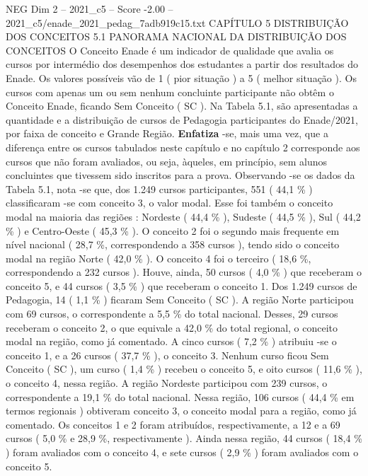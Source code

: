 \begin{textsample}{NEG Dim 2 – 2021\_c5 – Score -2.00 – 2021\_c5/enade\_2021\_pedag\_7adb919c15.txt}  \label{ex:f2_neg_143}
CAPÍTULO 5 DISTRIBUIÇÃO DOS CONCEITOS 5.1 PANORAMA NACIONAL DA DISTRIBUIÇÃO DOS CONCEITOS O Conceito Enade é um indicador de qualidade que avalia os cursos por intermédio dos desempenhos dos estudantes a partir dos resultados do Enade.
Os valores possíveis vão de 1 ( pior situação ) a 5 ( melhor situação ).
Os cursos com apenas um ou sem nenhum concluinte participante não obtêm o Conceito Enade, ficando Sem Conceito ( SC ).
Na Tabela 5.1, são apresentadas a quantidade e a distribuição de cursos de Pedagogia participantes do Enade/2021, por faixa de conceito e Grande Região. \textbf{Enfatiza} -se, mais uma vez, que a diferença entre os cursos tabulados neste capítulo e no capítulo 2 corresponde aos cursos que não foram avaliados, ou seja, àqueles, em princípio, sem alunos concluintes que tivessem sido inscritos para a prova.
Observando -se os dados da Tabela 5.1, nota -se que, dos 1.249 cursos participantes, 551 ( 44,1 \% ) classificaram -se com conceito 3, o valor modal.
Esse foi também o conceito modal na maioria das regiões : Nordeste ( 44,4 \% ), Sudeste ( 44,5 \% ), Sul ( 44,2 \% ) e Centro-Oeste ( 45,3 \% ).
O conceito 2 foi o segundo mais frequente em nível nacional ( 28,7 \%, correspondendo a 358 cursos ), tendo sido o conceito modal na região Norte ( 42,0 \% ).
O conceito 4 foi o terceiro ( 18,6 \%, correspondendo a 232 cursos ).
Houve, ainda, 50 cursos ( 4,0 \% ) que receberam o conceito 5, e 44 cursos ( 3,5 \% ) que receberam o conceito 1.
Dos 1.249 cursos de Pedagogia, 14 ( 1,1 \% ) ficaram Sem Conceito ( SC ).
A região Norte participou com 69 cursos, o correspondente a 5,5 \% do total nacional.
Desses, 29 cursos receberam o conceito 2, o que equivale a 42,0 \% do total regional, o conceito modal na região, como já comentado.
A cinco cursos ( 7,2 \% ) atribuiu -se o conceito 1, e a 26 cursos ( 37,7 \% ), o conceito 3.
Nenhum curso ficou Sem Conceito ( SC ), um curso ( 1,4 \% ) recebeu o conceito 5, e oito cursos ( 11,6 \% ), o conceito 4, nessa região.
A região Nordeste participou com 239 cursos, o correspondente a 19,1 \% do total nacional.
Nessa região, 106 cursos ( 44,4 \% em termos regionais ) obtiveram conceito 3, o conceito modal para a região, como já comentado.
Os conceitos 1 e 2 foram atribuídos, respectivamente, a 12 e a 69 cursos ( 5,0 \% e 28,9 \%, respectivamente ).
Ainda nessa região, 44 cursos ( 18,4 \% ) foram avaliados com o conceito 4, e sete cursos ( 2,9 \% ) foram avaliados com o conceito 5.

\end{textsample}
